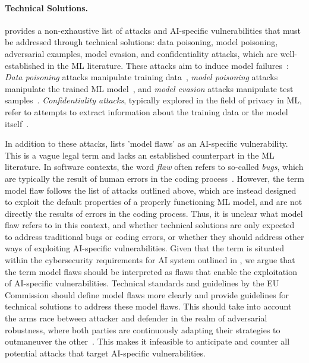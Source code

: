 \paragraph{Technical Solutions.}
 provides a non-exhaustive list of attacks and AI-specific vulnerabilities that must be addressed through technical solutions:
% 
data poisoning, model poisoning, adversarial examples, model evasion, and confidentiality attacks, which are well-established in the ML literature.
% 
These attacks aim to induce model failures~\cite{vassilev2024adversarial}:
% 
\emph{Data poisoning} attacks manipulate training data~\citep{schwarzschild2021just}, \emph{model poisoning} attacks manipulate the trained ML model~\cite{zhang2022fldetector}, and \emph{model evasion} attacks manipulate test samples~\citep{biggio2013evasion}.
% 
\emph{Confidentiality attacks}, typically explored in the field of privacy in ML, refer to attempts to extract information about the training data or the model itself~\citep{rigaki2023survey}. 

In addition to these attacks, 
  lists 'model flaws' as an AI-specific vulnerability.
 This is a vague legal term and lacks an established counterpart in the ML literature. 
 In software contexts, the word \emph{flaw} often refers to so-called \emph{bugs}, which are typically the result of human errors in the coding process~\cite{kumar2023, nissenbaum1996accountability}. 
 However, the term model flaw follows the list of attacks outlined above, which are instead designed to exploit the default properties of a properly functioning ML model, and are not directly the results of errors in the coding process.
 Thus, it is unclear what model flaw refers to in this context, and whether technical solutions are only expected to address traditional bugs or coding errors, or whether they should address other ways of exploiting AI-specific vulnerabilities.
%
Given that the term is situated within the cybersecurity requirements for AI system outlined in , we argue that the term model flaws should be interpreted as flaws that enable the exploitation of AI-specific vulnerabilities.
%
Technical standards and guidelines by the EU Commission should define model flaws more clearly and provide guidelines for technical solutions to address these model flaws.
%
This should take into account the arms race between attacker and defender in the realm of adversarial robustness, where both parties are continuously adapting their strategies to outmaneuver the other~\cite{chen2017adversarial}.
%
This makes it infeasible to anticipate and counter all potential attacks that target AI-specific vulnerabilities.

